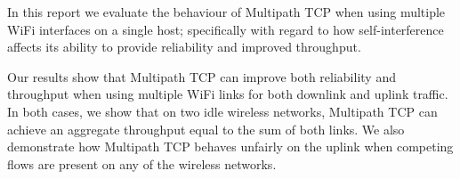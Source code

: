 In this report we evaluate the behaviour of Multipath TCP when using multiple
WiFi interfaces on a single host; specifically with regard to how
self-interference affects its ability to provide reliability and improved
throughput.

Our results show that Multipath TCP can improve both reliability and throughput
when using multiple WiFi links for both downlink and uplink traffic. In both
cases, we show that on two idle wireless networks, Multipath TCP can achieve an
aggregate throughput equal to the sum of both links. We also demonstrate how
Multipath TCP behaves unfairly on the uplink when competing flows are present on
any of the wireless networks.

